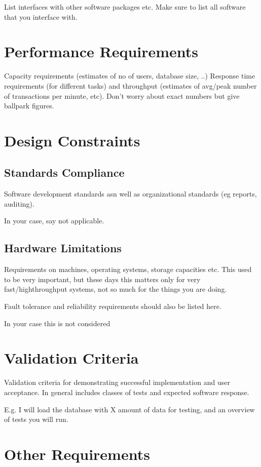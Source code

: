 \documentclass[a4wide]{article}
\begin{document}
List interfaces with other software packages etc.
Make sure to list all software that you interface with.



\section{Performance Requirements}

Capacity requirements (estimates of no of users, database size, ..)
Response time requirements (for different tasks)
and throughput (estimates of avg/peak number of transactions per minute, etc).
Don't worry about exact numbers but give ballpark figures.

 

\section{Design Constraints}

\subsection{Standards Compliance}

Software development standards asn well as organizational standards
(eg reports, auditing).

In your case, say not applicable.

\subsection{Hardware Limitations}

Requirements on machines, operating systems, storage capacities etc.
This used to be very important, but these days this matters only
for very fast/highthroughput systems, not so much for the things you
are doing.

Fault tolerance and reliability requirements should also be listed here.

In your case this is not considered
 

\section{Validation Criteria}

Validation criteria for demonstrating 
successful implementation and user acceptance.  
In general includes classes of tests and expected software response.

E.g. I will load the database with X amount of data for testing,
and an overview of tests you will run.


\section{Other Requirements}
\end{document}
